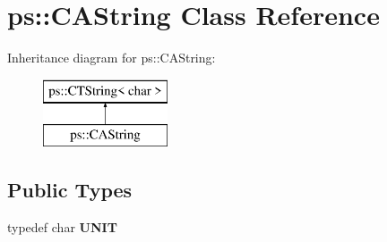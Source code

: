\hypertarget{classps_1_1CAString}{}\section{ps\+:\+:C\+A\+String Class Reference}
\label{classps_1_1CAString}
Inheritance diagram for ps\+:\+:C\+A\+String\+:\begin{figure}[H]
\begin{center}
\leavevmode
\includegraphics[height=2.000000cm]{classps_1_1CAString}
\end{center}
\end{figure}
\subsection*{Public Types}
\begin{DoxyCompactItemize}
\item 
\hypertarget{classps_1_1CAString_a4102d049d0e16acc35bbaab30e1f5461}{}typedef char {\bfseries U\+N\+I\+T}\label{classps_1_1CAString_a4102d049d0e16acc35bbaab30e1f5461}

\end{DoxyCompactItemize}
